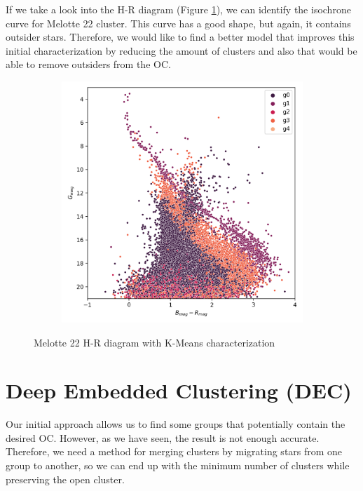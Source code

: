 \documentclass[11pt, a4paper, english]{book}
\begin{document}
If we take a look into the H-R diagram (Figure \ref{fig:kmeans_hr_diagram_melotte_22}), we can identify the isochrone curve for Melotte 22 cluster.
This curve has a good shape, but again, it contains outsider stars. Therefore, we would like to find a better model that improves this initial characterization
by reducing the amount of clusters and also that would be able to remove outsiders from the OC.

\begin{figure}[htbp]
  \centering
  \begin{subfigure}{0.5\textwidth}
    \centering
    \includegraphics[width=\textwidth]{../figures/melotte_22/kmeans_hr_diagram_melotte_22.png}
  \end{subfigure}
  \caption{Melotte 22 H-R diagram with K-Means characterization}
  \label{fig:kmeans_hr_diagram_melotte_22}
\end{figure}

\section{Deep Embedded Clustering (DEC)}
\label{sec:deep_embedding_clustering}

Our initial approach allows us to find some groups that potentially contain the desired OC. However, as we have seen, the result is not enough
accurate. Therefore, we need a method for merging clusters by migrating stars from one group to another,
so we can end up with the minimum number of clusters while preserving the open cluster.
\end{document}
